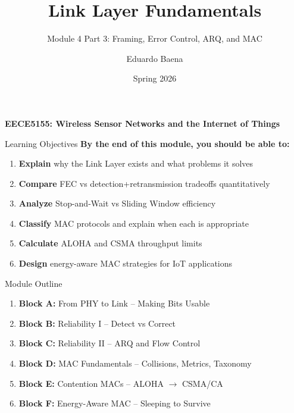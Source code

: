\documentclass[aspectratio=169,11pt]{beamer}
\title[EECE5155 -- Module 4 Part 3]{Link Layer Fundamentals}
\subtitle{Module 4 Part 3: Framing, Error Control, ARQ, and MAC}
\author{Eduardo Baena}
\date{Spring 2026}
\institute{Northeastern University\\Department of Electrical and Computer Engineering\\
\texttt{e.baena@northeastern.edu}}
\begin{document}
\begin{frame}
    \titlepage
    \vspace{-1cm}
    \begin{center}
        \textbf{EECE5155: Wireless Sensor Networks and the Internet of Things}
    \end{center}
\end{frame}

\begin{frame}{Learning Objectives}
    \textbf{By the end of this module, you should be able to:}
    \begin{enumerate}
        \item \textbf{Explain} why the Link Layer exists and what problems it solves
        \item \textbf{Compare} FEC vs detection+retransmission tradeoffs quantitatively
        \item \textbf{Analyze} Stop-and-Wait vs Sliding Window efficiency
        \item \textbf{Classify} MAC protocols and explain when each is appropriate
        \item \textbf{Calculate} ALOHA and CSMA throughput limits
        \item \textbf{Design} energy-aware MAC strategies for IoT applications
    \end{enumerate}
\end{frame}

\begin{frame}{Module Outline}
    \begin{enumerate}
        \item \textbf{Block A:} From PHY to Link -- Making Bits Usable
        \item \textbf{Block B:} Reliability I -- Detect vs Correct
        \item \textbf{Block C:} Reliability II -- ARQ and Flow Control
        \item \textbf{Block D:} MAC Fundamentals -- Collisions, Metrics, Taxonomy
        \item \textbf{Block E:} Contention MACs -- ALOHA $\rightarrow$ CSMA/CA
        \item \textbf{Block F:} Energy-Aware MAC -- Sleeping to Survive
    \end{enumerate}
\end{frame}
\end{document}
